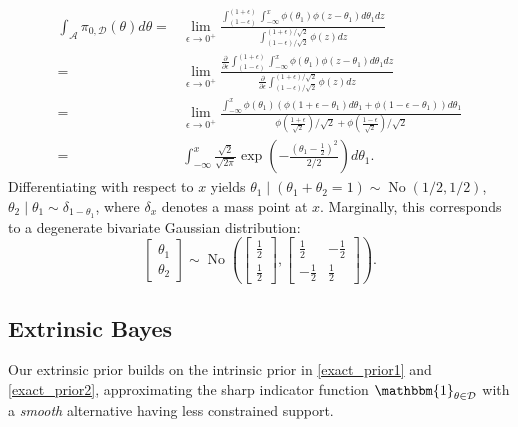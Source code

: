 \documentclass[10pt]{article}
\newcommand{\mc}[1]{\mathcal{#1}}
\DeclareMathOperator{\No}{No}
\DeclareMathOperator{\1}{\mathbbm{1}}
\begin{document}
\begin{equation*}
	\begin{aligned}
\int_{\mc A} \pi_{0,\mc D}(\theta) d\theta= 
& \lim_{\epsilon\rightarrow 0^+}\frac{
	\int_{(1-\epsilon)}^{(1+\epsilon)} \int_{-\infty}^{x} \phi(\theta_1)\phi(z-\theta_1) d\theta_1 dz  
}{
\int_{(1-\epsilon)/\sqrt 2}^{(1+\epsilon)/\sqrt 2} \phi(z) dz
} \\ 
= & \lim_{\epsilon\rightarrow 0^+}\frac{ \frac{\partial}{\partial \epsilon}
	\int_{(1-\epsilon)}^{(1+\epsilon)} \int_{-\infty}^{x} \phi(\theta_1)\phi(z-\theta_1) d\theta_1 dz  
}{
\frac{\partial}{\partial \epsilon}\int_{(1-\epsilon)/\sqrt 2}^{(1+\epsilon)/\sqrt 2} \phi(z) dz
} \\ 
= &  
\lim_{\epsilon\rightarrow 0^+}\frac{
	\int_{-\infty}^{x} \phi(\theta_1)\left( \phi({1+\epsilon} -\theta_1) d\theta_1  +  \phi({1-\epsilon}-\theta_1)\right) d\theta_1  
}{\phi (\frac{1+\epsilon}{\sqrt 2})/\sqrt 2 + \phi (\frac{1-\epsilon}{\sqrt 2})/\sqrt 2} \\
= & \int_{-\infty}^{x} \frac{\sqrt{2}}{\sqrt{2\pi}} \exp(-\frac{(\theta_1-\frac{1}{2})^2}{2/2}) d\theta_1.
\end{aligned}
\end{equation*}
Differentiating with respect to $x$ yields $\theta_1\mid (\theta_1+ \theta_2=1) \sim \No(1/2,1/2)$, $\theta_2\mid \theta_1 \sim \delta_{1-\theta_1}$, where $\delta_x$ denotes a mass point at $x$. Marginally, this corresponds to a degenerate bivariate Gaussian distribution:
$$\begin{bmatrix} \theta_1 \\ \theta_2 \end{bmatrix} \sim
\No \left(
 \begin{bmatrix} \frac{1}{2} \\ \frac{1}{2} \end{bmatrix},
\begin{bmatrix} \frac{1}{2} & -\frac{1}{2}  \\  -\frac{1}{2}  & \frac{1}{2} \end{bmatrix}
\right).$$


\subsection{Extrinsic Bayes}
Our extrinsic prior builds on the intrinsic prior in \eqref{exact_prior1} and \eqref{exact_prior2}, approximating the sharp indicator function
$\mathbbm{1}_{\theta\in \mc D}$ with a {\em smooth} alternative having less constrained support.
\end{document}
